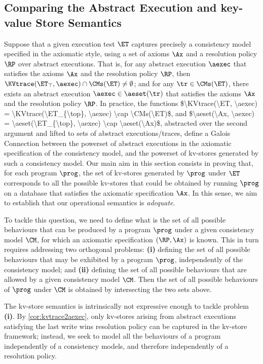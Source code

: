 \subsection{Comparing the Abstract Execution and key-value Store Semantics}

Suppose that a given execution test $\ET$ captures precisely 
a consistency model specified in the axiomatic style, using a set of 
axioms $\Ax$ and a resolution policy $\RP$ over abstract executions.
That is, for any abstract execution $\aexec$ that satisfies 
the axioms $\Ax$ and the resolution policy $\RP$, then $\KVtrace(\ET_{\top}, \aexec) \cap \CMs(\ET) \neq \emptyset$; 
and for any $\tr \in \CMs(\ET)$, there exists an abstract execution 
$\aexec \in \aeset(\tr)$ that satisfies the axioms $\Ax$ and the resolution policy $\RP$. 
\ac{In practice, the functions $\KVtrace(\ET, \aexec) = \KVtrace(\ET_{\top}, \aexec) \cap \CMs(\ET)$, 
and $\aeset(\Ax, \aexec) = \aeset(\ET_{\top}, \aexec) \cap \aeset(\Ax)$, abstracted over the second 
argument and lifted to sets of abstract executions/traces, 
define a Galois Connection between the powerset of abstract executions in the axiomatic specification 
of the consistency model, and the powerset of kv-stores generated by such a consistency model.}
Our main aim in this section consists in proving that, for each program $\prog$, the 
set of kv-stores generated by $\prog$ under $\ET$ corresponds to all the possible kv-stores 
that could be obtained by running $\prog$ on a database that satisfies the axiomatic specification 
$\Ax$. In this sense, we aim to establish that our operational semantics is \emph{adequate}.

To tackle this question, we need to define what is the set of all possible behaviours 
that can be produced by a program $\prog$ under a given consistency model $\CM$, for 
which an axiomatic specification $(\RP, \Ax)$ is known. This in turn requires addressing two orthogonal 
problems: \textbf{(i)} defining the set of all possible behaviours that may be exhibited by a program 
$\prog$, independently of the consistency model; and \textbf{(ii)} defining the set of all possible 
behaviours that are allowed by a given consistency model $\CM$. Then the set of all 
possible behaviours of $\prog$ under $\CM$ is obtained by intersecting the two sets 
above.

The kv-store semantics is intrinsically not expressive enough to tackle problem \textbf{(i)}. 
By \cref{cor:kvtrace2aexec}, only kv-stores arising 
from abstract executions satisfying the last write wins resolution policy can be captured in the kv-store 
framework; instead, we seek to model all the behaviours of a program independently of a consistency 
models, and therefore independently of a resolution policy. 

